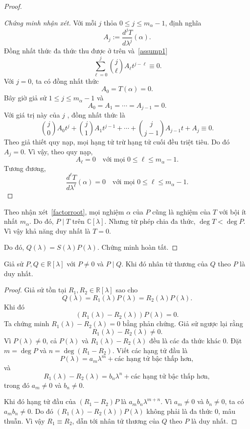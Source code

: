 ﻿\documentclass[12pt]{article}
\begin{document}
\begin{proof}
\begin{proof}[Chứng minh nhận xét]
Với mỗi $j$ thỏa $0\le j\le m_\alpha - 1$, định nghĩa
\[
 A_j:=
 \frac{d^jT}{d\lambda^j}(\alpha).
\]
Đồng nhất thức đa thức thu được ở trên và~\eqref{assump1} 
\[
 \sum_{\ell = 0}^{j}\binom{j}{\ell}A_\ell t^{j - \ell}\equiv0.
\]
Với $j = 0$, ta có đồng nhất thức 
\[
 A_0 = T(\alpha) = 0.
\]
Bây giờ giả sử $1\le j\le m_\alpha - 1$ và
\[
 A_0 = A_1 = \cdots = A_{j - 1} = 0.
\]
Với giá trị này của $j$ , đồng nhất thức là
\[
 \binom{j}{0}A_0t^j
 +
 \binom{j}{1}A_1t^{j - 1}
 + \cdots
 +
 \binom{j}{j - 1}A_{j - 1}t
 +
 A_j
 \equiv0.
\]
Theo giả thiết quy nạp, mọi hạng tử trừ hạng tử cuối đều triệt tiêu. Do đó
$A_j = 0$.
Vì vậy, theo quy nạp,
\[
 A_\ell = 0
 \quad
 \text{với mọi }0\le \ell\le m_\alpha - 1.
\]
Tương đương,
\[
 \frac{d^\ell T}{d\lambda^\ell}(\alpha) = 0
 \quad
 \text{với mọi }0\le \ell\le m_\alpha - 1.
\]
\end{proof}
Theo nhận xét~\ref{factorroot}, mọi nghiệm $\alpha$ của $P$ cũng là nghiệm của $T$ với bội ít nhất $m_\alpha$. Do đó,
$
 P \mid T
$ trên $\mathbb C[\lambda]$. Nhưng từ phép chia đa thức,
$
 \deg T < \deg P
$. Vì vậy khả năng duy nhất là $T = 0$.

Do đó, $Q(\lambda) = S(\lambda)P(\lambda)$. Chứng minh hoàn tất.
\end{proof}
\begin{lemma}\label{lem:operator-quotient-unique}
    Giả sử $P, Q \in \mathbb R[\lambda]$ với $P \neq 0$ và $P \mid Q$. Khi đó nhân tử thương của $Q$ theo $P$ là duy nhất.
\end{lemma}

\begin{proof}
    Giả sử tồn tại $R_1, R_2 \in \mathbb R[\lambda]$ sao cho
    \[
 Q(\lambda) = R_1(\lambda)P(\lambda) = R_2(\lambda)P(\lambda).
 \]
    Khi đó
    \[
 (R_1(\lambda) - R_2(\lambda))P(\lambda) = 0.
 \]
    Ta chứng minh $R_1(\lambda) - R_2(\lambda) = 0$ bằng phản chứng. Giả sử ngược lại rằng
    \[
 R_1(\lambda) - R_2(\lambda) \neq 0.
 \]
    Vì $P(\lambda) \neq 0$, cả $P(\lambda)$ và $R_1(\lambda) - R_2(\lambda)$ đều là các đa thức khác 0.
    Đặt $m = \deg P$ và  $n = \deg(R_1 - R_2)$. Viết các hạng tử đầu là
    \[
 P(\lambda) = a_m\lambda^m + \text{các hạng tử bậc thấp hơn},
 \]
    và
    \[
 R_1(\lambda) - R_2(\lambda) = b_n\lambda^n + \text{các hạng tử bậc thấp hơn},
 \]
    trong đó $a_m \neq 0$ và $b_n \neq 0$.

    Khi đó hạng tử đầu của $(R_1 - R_2)P$ là $a_mb_n\lambda^{m + n}$.
    Vì $a_m \neq 0$ và $b_n \neq 0$, ta có $a_mb_n \neq 0$.
    Do đó $ (R_1(\lambda) - R_2(\lambda))P(\lambda)$ không phải là đa thức 0, mâu thuẫn.
    Vì vậy $R_1\equiv R_2$, dẫn tới nhân tử thương của $Q$ theo $P$ là duy nhất.
\end{proof}
\end{document}
